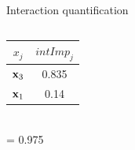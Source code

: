 \documentclass[11pt,compress,t,notes=noshow, aspectratio=169, xcolor=table,dvipsnames]{beamer}
\begin{document}
\begin{frame}{Interaction quantification}
\begin{columns}[T, totalwidth=\textwidth]
\begin{column}{0.52\textwidth}
 \vspace{-200px}
    \scriptsize
 \hspace{130px}
 \setlength{\tabcolsep}{1pt}
 \begin{tabular}{|c|c|}
    \hline
       $x_j$ & $intImp_j$  \\\hline
       \rowcolor{ForestGreen!70}
        $\mathbf{x}_3$     & 0.835 \\
        \rowcolor{YellowGreen!50}
        $\mathbf{x}_1$     &  0.14\\\hline
    \end{tabular}\\
 \hspace{138px}= 0.975

    \end{column}
\end{columns}

\end{frame}
\end{document}
